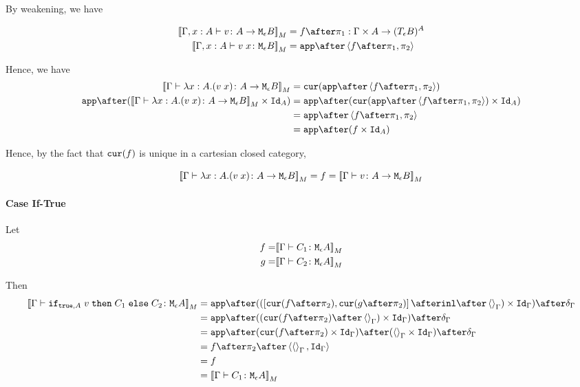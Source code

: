 {    By weakening, we have

    \begin{align}
        \deno{\typerelation{\gax}{v}{\aeb}} & = f \after \p : \G \times A \rightarrow (\teb)^A \\
        \deno{\typerelation{\gax}{\apply{v}{x}}{\meb}} & = \app\after\pr{f \after \p}{\pp} \\
    \end{align}

    Hence, we have 
    \begin{equation}
        \begin{split}
            \deno{\gtyperelation{\lam{x}{A}{(\apply{v}{x})}}{\aeb}} & = \cur{\app\after\pr{f \after \p}{\pp}}\\
            \app\after(\deno{\gtyperelation{\lam{x}{A}{(\apply{v}{x})}}{\aeb}} \times \Id{A}) & = \app \after(\cur{\app\after\pr{f \after \p}{\pp}}\times \Id{A})\\
            & = \app \after\pr{f\after\p}{\pp}\\
            & = \app\after(f\times\Id{A})
        \end{split}
    \end{equation}

    Hence, by the fact that $\texttt{cur}(f)$ is unique in a cartesian closed category, 

    \begin{equation}
        {\bf [\![}\Gamma \vdash \lambda x : A. (v\; x) \colon A \rightarrow \texttt{M}_{\epsilon}{B}{\bf ]\!]}_M = f ={\bf [\![}\Gamma \vdash v \colon A \rightarrow \texttt{M}_{\epsilon}{B}{\bf ]\!]}_M
    \end{equation}

    \paragraph{Case If-True}
    Let
    \begin{align}
        f = &{\bf [\![}\Gamma \vdash C_1 \colon \texttt{M}_{\epsilon}{A}{\bf ]\!]}_M\\
        g = &{\bf [\![}\Gamma \vdash C_2 \colon \texttt{M}_{\epsilon}{A}{\bf ]\!]}_M\\
    \end{align}

    Then
    \begin{equation}
        \begin{split}
            \deno{\gtyperelation{\ifthenelse{\t}{A}{v}{C_1}{C_2}}{\mea}} & = \ifMorph{\inl\after\term{\G}}{f}{g} \\
            & = \app\after((\cur{f\after\pp}\after\term{\G})\times\idg)\after\diag{\G}\\
            & = \app\after(\cur{f\after\pp}\times\idg)\after(\term{\G}\times\idg)\after\diag{\G}\\
            & = f\after\pp\after\pr{\term{\G}}{\idg}\\
            & = f \\
            & = \deno{\gtyperelation{C_1}{\mea}}\\
        \end{split}
    \end{equation}


}
